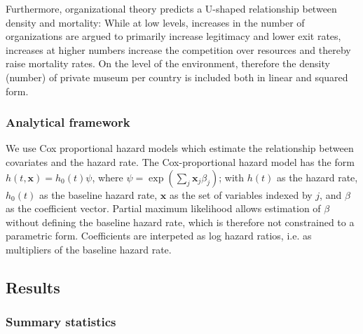 \documentclass[12pt]{article}
\begin{document}
Furthermore, organizational theory \parencite{hannan89_organ} predicts a U-shaped relationship between density and mortality:
While at low levels, increases in the number of organizations are argued to primarily increase legitimacy and lower exit rates, increases at higher numbers increase the competition over resources and thereby raise mortality rates.
On the level of the environment, therefore the density (number) of private museum per country is included both in linear and squared form.



\subsubsection*{Analytical framework}



We use Cox proportional hazard models which estimate the relationship between covariates and the hazard rate.
The Cox-proportional hazard model has the form \(h(t,\mathbf{x}) = h_0(t) \psi\), where \(\psi = \exp(\sum_{j} \mathbf{x}_j \beta_j)\); with \(h(t)\) as the hazard rate, \(h_0(t)\) as the baseline hazard rate, \(\mathbf{x}\) as the set of variables indexed by \(j\), and \(\beta\) as the coefficient vector.
Partial maximum likelihood allows estimation of \(\beta\) without defining the baseline hazard rate, which is therefore not constrained to a parametric form. 
Coefficients are interpeted as log hazard ratios, i.e. as multipliers of the baseline hazard rate. 



\subsection*{Results}


\subsubsection*{Summary statistics}
\end{document}
